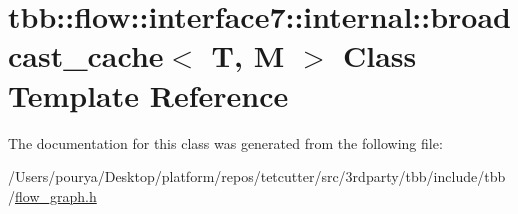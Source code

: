\hypertarget{classtbb_1_1flow_1_1interface7_1_1internal_1_1broadcast__cache}{}\section{tbb\+:\+:flow\+:\+:interface7\+:\+:internal\+:\+:broadcast\+\_\+cache$<$ T, M $>$ Class Template Reference}
\label{classtbb_1_1flow_1_1interface7_1_1internal_1_1broadcast__cache}


The documentation for this class was generated from the following file\+:\begin{DoxyCompactItemize}
\item 
/\+Users/pourya/\+Desktop/platform/repos/tetcutter/src/3rdparty/tbb/include/tbb/\hyperlink{flow__graph_8h}{flow\+\_\+graph.\+h}\end{DoxyCompactItemize}
